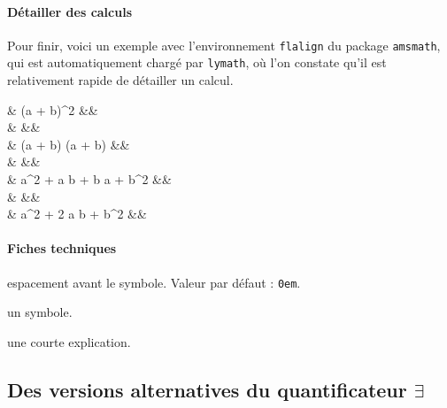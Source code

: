 \documentclass[12pt,a4paper]{article}
\theoremstyle{definition}
\begin{document}
\paragraph{Détailler des calculs}

Pour finir, voici un exemple avec l'environnement \verb+flalign+ du package \verb+amsmath+, qui est automatiquement chargé par \verb+lymath+, où l'on constate qu'il est relativement rapide de détailler un calcul.

\begin{tcblisting}{}
\begin{flalign*}
    & (a + b)^2
    &&\\
    & 
    &&\\
    & (a + b) (a + b)
    &&\\
    & 
    &&\\
    & a^2 + a b + b a + b^2
    &&\\
    & 
    &&\\
    & a^2 + 2 a b + b^2
    &&\\
\end{flalign*}
\end{tcblisting}



\paragraph{Fiches techniques}


\IDoption{} espacement avant le symbole. Valeur par défaut : \verb+0em+.

 un symbole.

 une courte explication.


\bigskip









\subsection{\texorpdfstring{Des versions alternatives du quantificateur $\exists$}%
                           {Des versions alternatives du quantificateur existentiel}}
         
\end{document}

